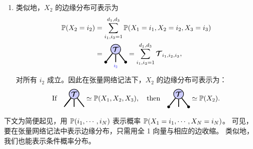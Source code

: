 \begin{enumerate}
\begin{align*}
\begin{tikzpicture}[baseline=\baseline]
    \draw[edge] (T) -- (m_1);
    \draw[edge](T) -- (\x,\y-0.65);
    \draw[edge](T) -- (\x+0.5,\y-0.65);
\end{tikzpicture}\simeq\PP(X_2, X_3).
\end{align*}
\item
类似地，$X_2$ 的边缘分布可表示为
\begin{align*}
\PP(X_2=i_2) 
&= \sum_{i_1,i_3=1}^{d_1,d_3}\PP(X_1=i_1,X_2= i_2, X_3=i_3)\\
&=
\begin{tikzpicture}[baseline=\baseline]
    \tikzset{tensor/.style = {minimum size = 0.5cm,shape = circle,thick,draw=black,inner sep = 0pt}, edge/.style = {thick,line width=.4mm},every loop/.style={}}
    \def\y{0.25}
    \def\x{0}
    \node[tensor,fill=blue!20!white] (T) at (\x,\y) {$\Tt$};
    \draw  node[fill = black,circle,inner sep=0pt,minimum size=4pt] (m_1) at (\x-0.5,\y-0.65) {};        \draw  node[fill = black,circle,inner sep=0pt,minimum size=4pt] (m_2) at (\x+0.5,\y-0.65) {};
    \draw[edge] (T) -- (m_1);
    \draw[edge](T) -- (m_2);
    \draw[edge](T) -- (\x,\y-0.65)node [very near end,below]
    {\scalebox{0.7}{\indcolor{$i_2$}}};
\end{tikzpicture}=\sum_{i_1,i_3=1}^{d_1,d_3}\Tt_{i_1,i_2,i_3},
\end{align*}
对所有 $i_2$ 成立。因此在张量网络记法下，$X_2$ 的边缘分布可表示为：
\begin{align*}
    \text{If}~~~ \begin{tikzpicture}[baseline=\baseline]
    \tikzset{tensor/.style = {minimum size = 0.5cm,shape = circle,thick,draw=black,inner sep = 0pt}, edge/.style = {thick,line width=.4mm},every loop/.style={}}
    \def\y{0.25}
    \def\x{0}
    \node[tensor,fill=blue!20!white] (T) at (\x,\y) {$\Tt$};
    \draw[edge] (T) -- (\x-0.5,\y-0.65);
    \draw[edge] (T) -- (m_1);
    \draw[edge](T) -- (\x,\y-0.65);
    \draw[edge](T) -- (\x+0.5,\y-0.65);
\end{tikzpicture}\simeq\PP(X_1, X_2, X_3),~~~\text{then}~~~
\begin{tikzpicture}[baseline=\baseline]
    \tikzset{tensor/.style = {minimum size = 0.5cm,shape = circle,thick,draw=black,inner sep = 0pt}, edge/.style = {thick,line width=.4mm},every loop/.style={}}
    \def\y{0.25}
    \def\x{0}
    \node[tensor,fill=blue!20!white] (T) at (\x,\y) {$\Tt$};
    \draw  node[fill = black,circle,inner sep=0pt,minimum size=4pt] (m_1) at (\x-0.5,\y-0.65) {};
    \draw  node[fill = black,circle,inner sep=0pt,minimum size=4pt] (m_2) at (\x+0.5,\y-0.65) {};
    \draw[edge] (T) -- (m_1);
    \draw[edge](T) -- (\x,\y-0.65);
    \draw[edge](T) -- (\x+0.5,\y-0.65);
\end{tikzpicture}\simeq\PP(X_2).
\end{align*}
\end{enumerate}
下文为简便起见，用 $\mathbb{P}(i_1,\cdots,i_N)$ 表示概率 $\mathbb{P}(X_1=i_1,\cdots,X_N=i_N)$。 
可见，要在张量网络记法中表示边缘分布，只需用全 1 向量与相应的边收缩。
类似地，我们也能表示条件概率分布。
